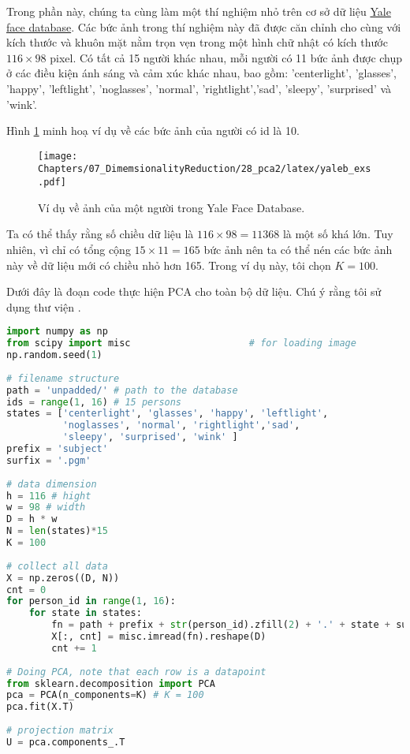 Trong phần này, chúng ta cùng làm một thí nghiệm nhỏ trên cơ sở dữ liệu \href{http://vismod.media.mit.edu/vismod/classes/mas622-00/datasets/}{Yale face database}. Các bức ảnh trong thí nghiệm này đã được căn chỉnh cho cùng với kích thước và khuôn mặt nằm trọn vẹn trong một hình chữ nhật có kích thước $116 \times  98$ pixel. Có tất cả 15 người khác nhau, mỗi người có 11 bức ảnh được chụp ở các điều kiện ánh sáng và cảm xúc khác nhau, bao gồm: 'centerlight', 'glasses', 'happy', 'leftlight', 'noglasses', 'normal', 'rightlight','sad', 'sleepy', 'surprised' và 'wink'. 
 
Hình \ref{fig:28_1} minh hoạ ví dụ về các bức ảnh của người có id là 10. 
 

\begin{figure}[t]
\centering
    \texttt{[image: Chapters/07\_DimemsionalityReduction/28\_pca2/latex/yaleb\_exs.pdf]}
    \caption[]{Ví dụ về ảnh của một người trong Yale Face Database.}
    \label{fig:28_1}
\end{figure}
Ta có thể thấy rằng số chiều dữ liệu là $116 \times 98 = 11368$ là một số khá lớn. Tuy nhiên, vì chỉ có tổng cộng $15 \times 11 = 165$ bức ảnh nên ta có thể nén các bức ảnh này về dữ liệu mới có chiều nhỏ hơn 165. Trong ví dụ này, tôi chọn $K = 100$. 
 
Dưới đây là đoạn code thực hiện PCA cho toàn bộ dữ liệu. Chú ý rằng tôi sử dụng thư viện . 
 
\begin{lstlisting}[language=Python]
import numpy as np 
from scipy import misc                     # for loading image 
np.random.seed(1) 
 
# filename structure 
path = 'unpadded/' # path to the database 
ids = range(1, 16) # 15 persons 
states = ['centerlight', 'glasses', 'happy', 'leftlight', 
          'noglasses', 'normal', 'rightlight','sad', 
          'sleepy', 'surprised', 'wink' ] 
prefix = 'subject' 
surfix = '.pgm' 
 
# data dimension 
h = 116 # hight 
w = 98 # width 
D = h * w 
N = len(states)*15 
K = 100 
 
# collect all data 
X = np.zeros((D, N)) 
cnt = 0 
for person_id in range(1, 16): 
    for state in states: 
        fn = path + prefix + str(person_id).zfill(2) + '.' + state + surfix 
        X[:, cnt] = misc.imread(fn).reshape(D) 
        cnt += 1 
 
# Doing PCA, note that each row is a datapoint 
from sklearn.decomposition import PCA 
pca = PCA(n_components=K) # K = 100 
pca.fit(X.T) 
 
# projection matrix 
U = pca.components_.T 
\end{lstlisting}
 

